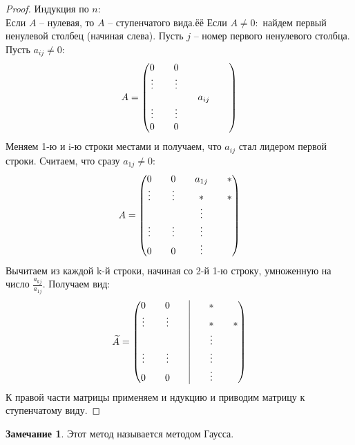 \documentclass[a4paper, 12pt]{article}
\theoremstyle{definition}
\newtheorem*{remark}{Замечание}
\begin{document}
    \begin{proof}
        Индукция по $n:$\\
        Если $A$ -- нулевая, то $A$ -- ступенчатого вида.ёё
        Если $A \neq 0:$ найдем первый ненулевой столбец (начиная слева). Пусть $j$ -- номер первого ненулевого столбца. Пусть $a_{ij} \neq 0:$
        $$A = \begin{pmatrix}
            0 && 0 && && \null\\
            \vdots && \vdots && \null\\
            \null && \null && a_{ij}\\
            \vdots && \vdots && \null\\
            0 && 0 && \null
        \end{pmatrix}$$  
        Меняем 1-ю и i-ю строки местами и получаем, что $a_{ij}$ стал лидером первой строки. Считаем, что сразу $a_{1j} \neq 0:$
        $$A = \begin{pmatrix}
            0 && 0 && a_{1j} && *\\
            \vdots && \vdots && * && *\\
            \null && \null && \vdots && \null\\
            \vdots && \vdots && \vdots && \null\\
            0 && 0 && \vdots && \null
        \end{pmatrix}$$  
        Вычитаем из каждой k-й строки, начиная со 2-й 1-ю строку, умноженную на число $\frac{a_{kj}}{a_{1j}}$. Получаем вид:
        $$\widetilde{A} = \begin{pmatrix}
            0 && 0 && \vline && *\\
            \vdots && \vdots && \vline &&  * && *\\
            \null && \null && \vline && \vdots && \null\\
            \vdots && \vdots && \vline && \vdots && \null\\
            0 && 0 && \vline &&  \vdots && \null
        \end{pmatrix}$$ 
        К правой части матрицы применяем и ндукцию и приводим матрицу к ступенчатому виду.

    \end{proof}
    \begin{remark}
        Этот метод называется методом Гаусса.
    \end{remark}
    
\end{document}
